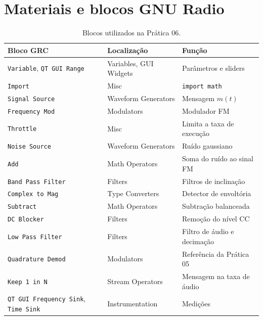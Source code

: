 \documentclass[11pt,a4paper]{article}
\begin{document}
\section{Materiais e blocos GNU Radio}

\begin{table}[H]
  \centering\small
  \begin{tabular}{l l l}
    \toprule
    \textbf{Bloco GRC} & \textbf{Localização} & \textbf{Função} \\
    \midrule
    \texttt{Variable}, \texttt{QT GUI Range} & Variables, GUI Widgets & Parâmetros e sliders \\
    \texttt{Import}            & Misc                 & \texttt{import math} \\
    \texttt{Signal Source}     & Waveform Generators  & Mensagem $m(t)$ \\
    \texttt{Frequency Mod}     & Modulators           & Modulador FM \\
    \texttt{Throttle}          & Misc                 & Limita a taxa de execução \\
    \texttt{Noise Source}      & Waveform Generators  & Ruído gaussiano \\
    \texttt{Add}               & Math Operators       & Soma do ruído ao sinal FM \\
    \texttt{Band Pass Filter}  & Filters              & Filtros de inclinação \\
    \texttt{Complex to Mag}    & Type Converters      & Detector de envoltória \\
    \texttt{Subtract}          & Math Operators       & Subtração balanceada \\
    \texttt{DC Blocker}        & Filters              & Remoção do nível CC \\
    \texttt{Low Pass Filter}   & Filters              & Filtro de áudio e decimação \\
    \texttt{Quadrature Demod}  & Modulators           & Referência da Prática 05 \\
    \texttt{Keep 1 in N}       & Stream Operators     & Mensagem na taxa de áudio \\
    \texttt{QT GUI Frequency Sink}, \texttt{Time Sink} & Instrumentation & Medições \\
    \bottomrule
  \end{tabular}
  \caption{Blocos utilizados na Prática 06.}
\end{table}
\end{document}

